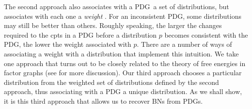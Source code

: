 \documentclass{article}
\newcommand{\commentout}[1]{\ignorespaces}
\newcommand{\MN}{PDG}
\numberwithin{equation}{section}
\begin{document}
\begin{notfocus}
The second approach also associates with a \MN\ a set of
  distributions, but associates with each one a \emph{weight}
  \parencite[cf.][]{halpern2015weighted}.  For an inconsistent \MN,
  some distributions may still be better than others.
  Roughly speaking, the larger the changes required to the cpts in a PDG
before a distribution $p$ becomes consistent with the PDG, the lower
the weight associated with $p$.  There are a number of ways of
associating a weight with a distribution that implement this
intuition.  We take one approach that turns out to be closely related
to the theory of free energies in factor graphs (see
 for more discussion).
  Our third approach chooses a particular
          distribution from the weighted set of distributions defined
          by the second approach, thus associating with a PDG a unique
          distribution.  
	As we shall show, it is this third approach that allows us to
        recover BNs from PDGs. 


\end{notfocus}
\end{document}
